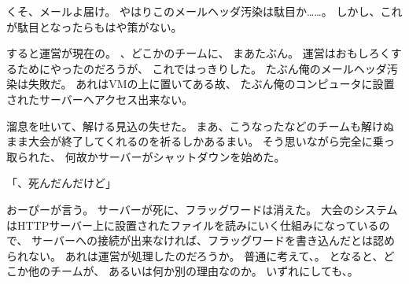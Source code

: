 くそ、メールよ届け。
やはりこのメールヘッダ汚染は駄目か……。
しかし、これが駄目となったらもはや策がない。

すると運営が現在の。
、どこかのチームに、
まあたぶん。
運営はおもしろくするためにやったのだろうが、
これではっきりした。
たぶん俺のメールヘッダ汚染は失敗だ。
あれはVMの上に置いてある故、
たぶん俺のコンピュータに設置されたサーバーへアクセス出来ない。

溜息を吐いて、解ける見込の失せた。
まあ、こうなったなどのチームも解けぬまま大会が終了してくれるのを祈るしかあるまい。
そう思いながら完全に乗っ取られた、
何故かサーバーがシャットダウンを始めた。

「\Jupiter、死んだんだけど」

おーぴーが言う。
サーバーが死に、フラッグワードは消えた。
大会のシステムはHTTPサーバー上に設置されたファイルを読みにいく仕組みになっているので、
サーバーへの接続が出来なければ、フラッグワードを書き込んだとは認められない。
あれは運営が処理したのだろうか。
普通に考えて、。
となると、どこか他のチームが、
あるいは何か別の理由なのか。
いずれにしても、。


